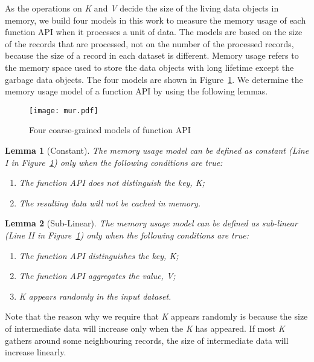 As the operations on \textit{K} and \textit{V} decide the size of the living data objects in memory, we build four models in this work to measure the memory usage of each function API when it processes a unit of data. The models are based on the size of the records that are processed, not on the number of the processed records, because the size of a record in each dataset is different. Memory usage refers to the memory space used to store the data objects with long lifetime except the garbage data objects. The four models are shown in Figure~\ref{fig:mur}. We determine the memory usage model of a function API by using the following lemmas.

\begin{figure}[!t]
\centering
\texttt{[image: mur.pdf]}
\vspace{-2mm}
\caption{Four coarse-grained models of function API}
\vspace{-4mm}
\label{fig:mur}
\end{figure}

\newtheorem{lemma}{Lemma}
\begin{lemma}[Constant] The memory usage model can be defined as constant (Line I in Figure~\ref{fig:mur}) only when the following conditions are true:
\begin{enumerate}
\item The function API does not distinguish the key, \textit{K};
\item The resulting data will not be cached in memory.
\end{enumerate}
\end{lemma}

\begin{lemma}[Sub-Linear] The memory usage model can be defined as sub-linear (Line II in Figure~\ref{fig:mur}) only when the following conditions are true:
\begin{enumerate}
\item The function API distinguishes the key, \textit{K};
\item The function API aggregates the value, \textit{V};
\item \textit{K} appears randomly in the input dataset.
\end{enumerate}
\end{lemma}

Note that the reason why we require that \textit{K} appears randomly is because the size of intermediate data will increase only when the \textit{K} has appeared. If most \textit{K} gathers around some neighbouring records, the size of intermediate data will increase linearly.

